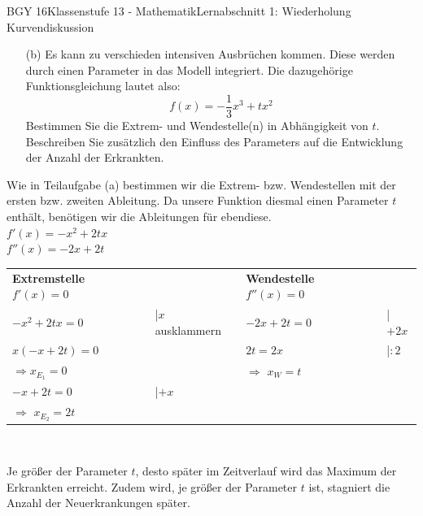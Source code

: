 \documentclass[oneside,openany,headings=optiontotoc,11pt,numbers=noenddot]{scrreprt}
\begin{document}
\begin{worksheet}{BGY 16}{Klassenstufe 13 - Mathematik}{Lernabschnitt 1: Wiederholung Kurvendiskussion}
\begin{framed}
\begin{center}
			\end{center}
		\end{framed}
		\begin{itemize}
			\item[(b)] Es kann zu verschieden intensiven Ausbrüchen kommen. Diese werden durch einen Parameter in das Modell integriert. Die dazugehörige Funktionsgleichung lautet also:
			\[f(x) = -\frac{1}{3}x^3 +tx^2\]
			Bestimmen Sie die Extrem- und Wendestelle(n) in Abhängigkeit von \(t\).\\
			Beschreiben Sie zusätzlich den Einfluss des Parameters auf die Entwicklung der Anzahl der Erkrankten.
		\end{itemize}
		\begin{framed}
			\noindent
			Wie in Teilaufgabe (a) bestimmen wir die Extrem- bzw. Wendestellen mit der ersten bzw. zweiten Ableitung. Da unsere Funktion diesmal einen Parameter \(t\) enthält, benötigen wir die Ableitungen für ebendiese.\\
			\(f'(x) = -x^2 +2tx\)\\
			\(f''(x) = -2x +2t\)\\
			\par\noindent
			\begin{tabularx}{\textwidth}{Xl|Xl}
				\textbf{Extremstelle} \(f'(x) = 0\) & & \textbf{Wendestelle} \(f''(x) = 0\)\\
				\(-x^2 + 2tx = 0\) & |\(x\) ausklammern & \(-2x + 2t = 0\) & |\(+2x\)\\
				\(x(-x+2t) = 0\) & & \(2t = 2x\) & |\(:2\)\\
				\(\Rightarrow x_{E_1} = 0\) & & \(\Rightarrow\) \colorbox{green!10}{\(x_W = t\)}\\
				\(-x+2t = 0\) & |\(+x\)\\
				\(\Rightarrow\) \colorbox{green!10}{\(x_{E_2} = 2t\)}
			\end{tabularx}\\
			\par\noindent
			Je größer der Parameter \(t\), desto später im Zeitverlauf wird das Maximum der Erkrankten erreicht. Zudem wird, je größer der Parameter \(t\) ist, stagniert die Anzahl der Neuerkrankungen später.
		\end{framed}
	\end{worksheet}
\end{document}
